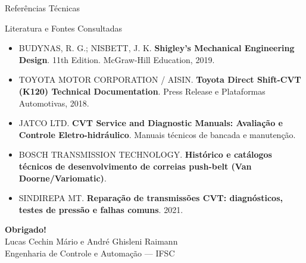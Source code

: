 \documentclass{beamer}
\begin{document}
    \begin{frame}{Referências Técnicas}
    \begin{block}{Literatura e Fontes Consultadas}
        \begin{itemize}
            \item BUDYNAS, R. G.; NISBETT, J. K. \textbf{Shigley's Mechanical Engineering Design}. 11th Edition. McGraw-Hill Education, 2019.
            \item TOYOTA MOTOR CORPORATION / AISIN. \textbf{Toyota Direct Shift-CVT (K120) Technical Documentation}. Press Release e Plataformas Automotivas, 2018.
            \item JATCO LTD. \textbf{CVT Service and Diagnostic Manuals: Avaliação e Controle Eletro-hidráulico}. Manuais técnicos de bancada e manutenção.
            \item BOSCH TRANSMISSION TECHNOLOGY. \textbf{Histórico e catálogos técnicos de desenvolvimento de correias push-belt (Van Doorne/Variomatic)}.
            \item SINDIREPA MT. \textbf{Reparação de transmissões CVT: diagnósticos, testes de pressão e falhas comuns}. 2021.
        \end{itemize}
    \end{block}
    \end{frame}

  \begin{frame}
    \centering
    \vspace{1cm}
    \Large \textbf{Obrigado!} \\
    \vspace{0.5cm}
    \normalsize Lucas Cechin Mário e André Ghisleni Raimann \\
    Engenharia de Controle e Automação — IFSC
  \end{frame}
\end{document}
